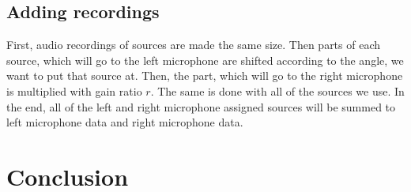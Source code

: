 \subsection{Adding recordings}
First, audio recordings of sources are made the same size. Then parts of each source, which will go to the left 
microphone are shifted according to the angle, we want to put that source at. Then, the part, which will go to the 
right microphone is multiplied with gain ratio \(r\). The same is done with all of the sources we use. In the end, 
all of the left and right microphone assigned sources will be summed to left microphone data and right microphone 
data. 


 

\section{Conclusion}